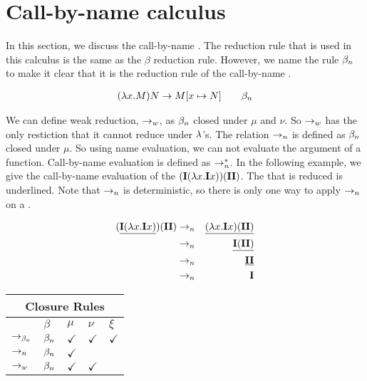 
\section{Call-by-name calculus}
In this section, we discuss the call-by-name \lc. 
The reduction rule that is used in this calculus is the same as the $\beta$ reduction rule.
However, we name the rule $\beta_n$ to make it clear that it is the reduction rule of the call-by-name \lc.

\begin{align*}
	(\lambda {x}.{M})N \to M [{x}\mapsto{N}] \quad \quad \beta_n
\end{align*}


We can define weak reduction, $\to_w$, as $\beta_n$ closed under $\mu$ and $\nu$. So $\to_w$ has the only restiction that it cannot reduce under $\lambda$'s.
The relation $\to_n$ is defined as $\beta_n$ closed under $\mu$. So using name evaluation, we can not evaluate the argument of a function. 
Call-by-name evaluation is defined as $\to_n^*$. In the following example, we give the call-by-name evaluation of the \lterm $(\mathbf{I}(\lambda {x}.{\mathbf{I} x}))(\mathbf{I} \mathbf{I})$.
The \bre that is reduced is underlined.
Note that $\to_n$ is deterministic, so there is only one way to apply $\to_n$ on a \lterm.

\begin{eqnarray*}
	(\underline{\mathbf{I}(\lambda {x}.{\mathbf{I} x})})(\mathbf{I} \mathbf{I}) &\to_n& \underline{(\lambda {x}.{\mathbf{I} x}) (\mathbf{I} \mathbf{I})} \\
	&\to_n& \underline{\mathbf{I} (\mathbf{I} \mathbf{I})} \\
	&\to_n& \underline{\mathbf{I} \mathbf{I}} \\
	&\to_n& \mathbf{I} 
\end{eqnarray*}

\begin{table}[htbp]
\centering
\begin{tabularx}{\linewidth}{|X|XXXX|}
	\hline
	\multicolumn{5}{|c|}{\textbf{Closure Rules}}\\
	\hline
  & {$\beta$} & $\mu$ & $\nu$ & $\xi$ \\
	\hline
	$\to_{\beta_n}$ & $\beta_n$ & $\checkmark$ & $\checkmark$ & $\checkmark$ \\
	\hline
	$\to_n$  & $\beta_n$ & $\checkmark$ & 						 &  \\
	\hline
	$\to_w$  & $\beta_n$ & $\checkmark$ & $\checkmark$ &  \\
	\hline
\end{tabularx}
\end{table}